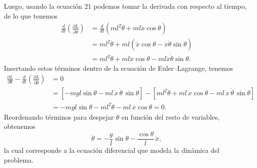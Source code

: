 \documentclass[
  11pt,
  letterpaper,
   addpoints,
   answers
  ]{exam}
\begin{document}
\begin{questions}
\begin{solution}
Luego, usando la ecuación 21 podemos tomar la derivada con respecto al tiempo, de lo que tenemos
\begin{align}
    \frac{d}{dt} \left( \frac{\partial L}{\partial \dot{\theta}} \right) 
    &= \frac{d}{dt} \left( ml^2 \dot{\theta} + ml \dot{x} \cos \theta \right) \tag{22}\\
    &= ml^2 \ddot{\theta} + ml \left( \ddot{x} \cos \theta - \dot{x} \dot{\theta} \sin \theta \right) \\
    &= ml^2 \ddot{\theta} + ml \ddot{x} \cos \theta - ml \dot{x} \dot{\theta} \sin \theta.
\end{align}
Insertando estos términos dentro de la ecuación de Euler--Lagrange, tenemos
\begin{align}
    \frac{\partial L}{\partial \theta} - \frac{d}{dt} \left( \frac{\partial L}{\partial \dot{\theta}} \right) &= 0 \\
    &= \left[ -mgl \sin \theta - ml\,\dot{x}\,\dot{\theta}\,\sin \theta \right] 
       - \left[ ml^2 \ddot{\theta} + ml\,\ddot{x} \cos \theta - ml\,\dot{x}\,\dot{\theta}\,\sin \theta \right] \\
    &= -mgl \sin \theta - ml^2 \ddot{\theta} - ml\,\ddot{x} \cos \theta = 0. 
\end{align}
Reordenando términos para despejar \(\ddot{\theta}\) en función del resto de variables, obtenemos
\begin{equation}
    \ddot{\theta} = -\frac{g}{l} \sin \theta - \frac{\cos \theta}{l} \,\ddot{x}, 
\end{equation}
la cual corresponde a la ecuación diferencial que modela la dinámica del problema.

\end{solution}
\end{questions}
\end{document}
